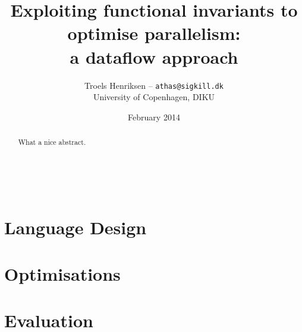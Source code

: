 \documentclass[10pt,a4paper,final,oneside,openany]{memoir}
\title{Exploiting functional invariants to optimise parallelism:\\a dataflow approach}
\author{
  Troels Henriksen -- \texttt{athas@sigkill.dk} \\
University of Copenhagen, DIKU}
\date{February 2014}
\begin{document}
\frontmatter

% 

 \clearpage

\maketitle
~
\vspace{3cm}
  \begin{abstract}
    What a nice abstract.
  \end{abstract}

\clearpage
\tableofcontents*

\mainmatter
{}


\part{Language Design}
\label{part:languagedesign}







\part{Optimisations}







\part{Evaluation}





\clearpage

{}
\printbibliography

\backmatter
\appendix

\end{document}
